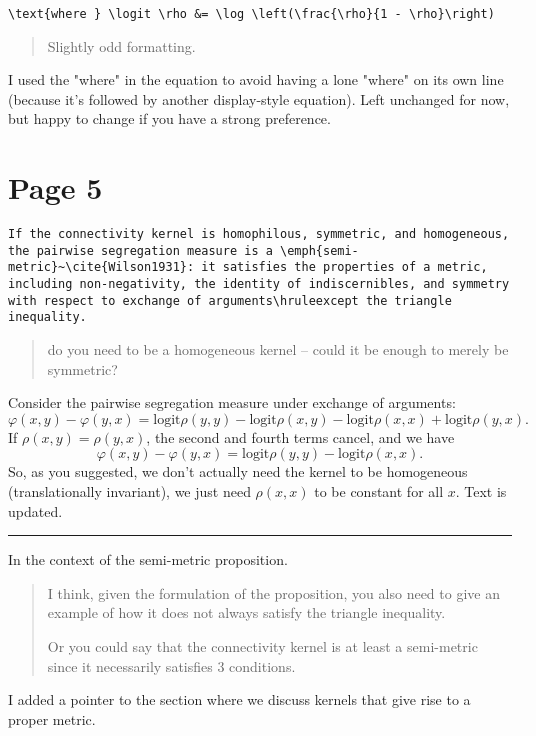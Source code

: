 \documentclass{scrartcl}
\begin{document}
\begin{lstlisting}
\text{where } \logit \rho &= \log \left(\frac{\rho}{1 - \rho}\right)
\end{lstlisting}
\begin{quote}
Slightly odd formatting.
\end{quote}
I used the "where" in the equation to avoid having a lone "where" on its own line (because it's followed by another display-style equation). Left unchanged for now, but happy to change if you have a strong preference.

\section*{Page 5}

\begin{lstlisting}
If the connectivity kernel is homophilous, symmetric, and homogeneous, the pairwise segregation measure is a \emph{semi-metric}~\cite{Wilson1931}: it satisfies the properties of a metric, including non-negativity, the identity of indiscernibles, and symmetry with respect to exchange of arguments\hruleexcept the triangle inequality.
\end{lstlisting}
\begin{quote}
do you need to be a homogeneous kernel -- could it be enough to merely be symmetric?
\end{quote}
Consider the pairwise segregation measure under exchange of arguments:
$$
\varphi(x,y) - \varphi(y, x) = \mathrm{logit}\rho(y, y) - \mathrm{logit}\rho(x, y) - \mathrm{logit}\rho(x, x) + \mathrm{logit}\rho(y, x).
$$
If $\rho(x,y) = \rho(y, x)$, the second and fourth terms cancel, and we have
$$
\varphi(x,y) - \varphi(y, x) = \mathrm{logit}\rho(y, y) - \mathrm{logit}\rho(x, x).
$$
So, as you suggested, we don't actually need the kernel to be homogeneous (translationally invariant), we just need $\rho(x,x)$ to be constant for all $x$. Text is updated.

\hrule

In the context of the semi-metric proposition.

\begin{quote}
I think, given the formulation of the proposition, you also need to give an example of how it does not always satisfy the triangle inequality.

Or you could say that the connectivity kernel is at least a semi-metric since it necessarily satisfies 3 conditions.
\end{quote}
I added a pointer to the section where we discuss kernels that give rise to a proper metric.
\end{document}
